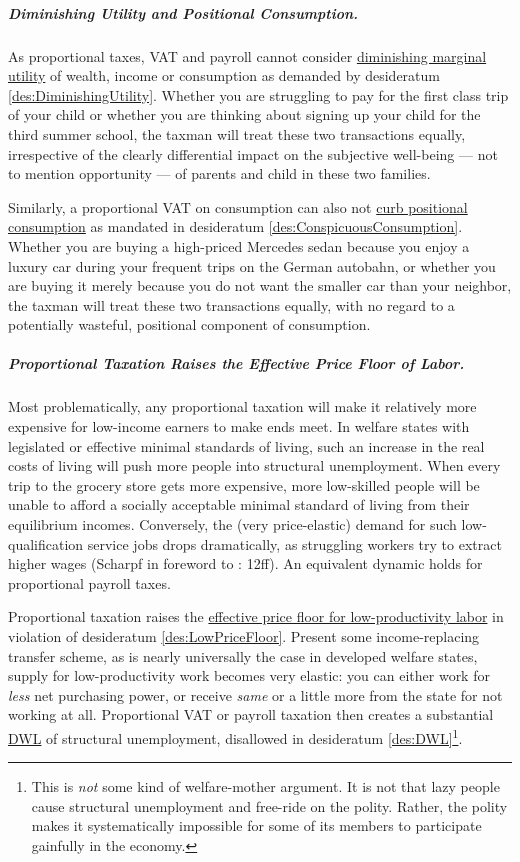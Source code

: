 \subparagraph{Diminishing Utility and Positional Consumption.} As proportional taxes, VAT and payroll cannot consider \hyperref[des:DiminishingUtility]{diminishing marginal utility} of wealth, income or consumption as demanded by desideratum \ref{des:DiminishingUtility}. Whether you are struggling to pay for the first class trip of your child or whether you are thinking about signing up your child for the third summer school, the taxman will treat these two transactions equally, irrespective of the clearly differential impact on the subjective well-being --- not to mention opportunity --- of parents and child in these two families. 

Similarly, a proportional VAT on consumption can also not \hyperref[des:ConspicuousConsumption]{curb positional consumption} as mandated in desideratum \ref{des:ConspicuousConsumption}. Whether you are buying a high-priced Mercedes sedan because you enjoy a luxury car during your frequent trips on the German autobahn, or whether you are buying it merely because you do not want the smaller car than your neighbor, the taxman will treat these two transactions equally, with no regard to a potentially wasteful, positional component of consumption.

\subparagraph{Proportional Taxation Raises the Effective Price Floor of Labor.}  \label{sec:PropTaxDWL} Most problematically, any proportional taxation will make it relatively more expensive for low-income earners to make ends meet. In welfare states with legislated or effective minimal standards of living, such an increase in the real costs of living will push more people into structural unemployment. When every trip to the grocery store gets more expensive, more low-skilled people will be unable to afford a socially acceptable minimal standard of living from their equilibrium incomes. Conversely, the (very price-elastic) demand for such low-qualification service jobs drops dramatically, as struggling workers try to extract higher wages (Scharpf in foreword to \citealt{Ganghof2004}: 12ff). An equivalent dynamic holds for proportional payroll taxes.

Proportional taxation raises the \hyperref[des:LowPriceFloor]{effective price floor for low-productivity labor} in violation of desideratum \ref{des:LowPriceFloor}. Present some income-replacing transfer scheme, as is nearly universally the case in developed welfare states, supply for low-productivity work becomes very elastic: you can either work for \emph{less} net purchasing power, or receive \emph{same} or a little more from the state for not working at all. Proportional VAT or payroll taxation then creates a substantial \hyperref[des:DWL]{DWL} of structural unemployment, disallowed in desideratum \ref{des:DWL}\footnote{
	This is \emph{not} some kind of welfare-mother argument. It is not that lazy people cause structural unemployment and free-ride on the polity. Rather, the polity makes it systematically impossible for some of its members to participate gainfully in the economy.}.

